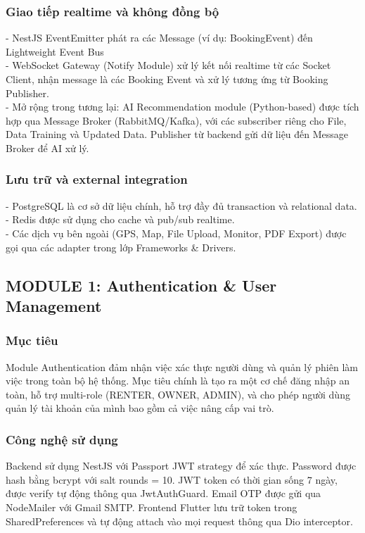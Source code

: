 \subsubsection{Giao tiếp realtime và không đồng bộ}
- NestJS EventEmitter phát ra các Message (ví dụ: BookingEvent) đến Lightweight Event Bus\\
- WebSocket Gateway (Notify Module) xử lý kết nối realtime từ các Socket Client, nhận message là các Booking Event và xử lý tương ứng từ Booking Publisher.\\
- Mở rộng trong tương lại: AI Recommendation module (Python-based) được tích hợp qua Message Broker (RabbitMQ/Kafka), với các subscriber riêng cho 
File, Data Training và Updated Data. Publisher từ backend gửi dữ liệu đến Message Broker để AI xử lý.
\subsubsection{Lưu trữ và external integration}
- PostgreSQL là cơ sở dữ liệu chính, hỗ trợ đầy đủ transaction và relational data.\\
- Redis được sử dụng cho cache và pub/sub realtime.\\
- Các dịch vụ bên ngoài (GPS, Map, File Upload, Monitor, PDF Export) được gọi qua các adapter trong lớp Frameworks \& Drivers.
\subsection{MODULE 1: Authentication \& User Management}

\subsubsection{Mục tiêu}
Module Authentication đảm nhận việc xác thực người dùng và quản lý phiên làm việc trong toàn bộ hệ thống. Mục tiêu chính là tạo ra một cơ chế đăng nhập an toàn, hỗ trợ multi-role (RENTER, OWNER, ADMIN), và cho phép người dùng quản lý tài khoản của mình bao gồm cả việc nâng cấp vai trò.

\subsubsection{Công nghệ sử dụng}
Backend sử dụng NestJS với Passport JWT strategy để xác thực. Password được hash bằng bcrypt với salt rounds = 10. JWT token có thời gian sống 7 ngày, được verify tự động thông qua JwtAuthGuard. Email OTP được gửi qua NodeMailer với Gmail SMTP. Frontend Flutter lưu trữ token trong SharedPreferences và tự động attach vào mọi request thông qua Dio interceptor.

